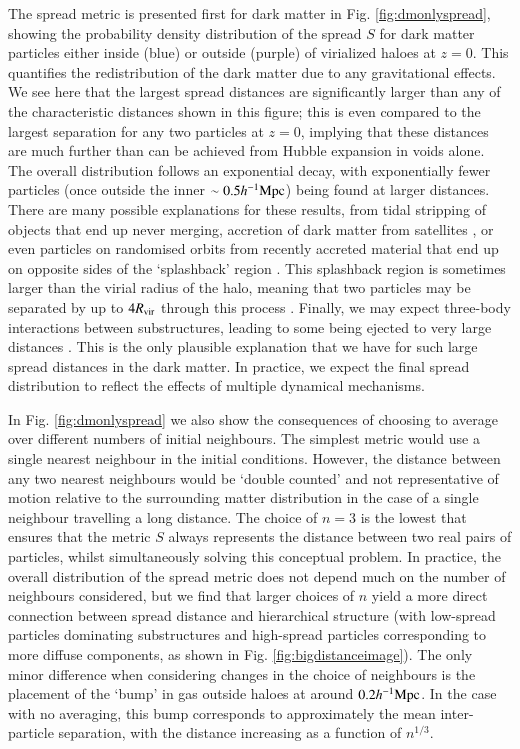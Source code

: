 The spread metric is presented first for dark matter in Fig.
\ref{fig:dmonlyspread}, showing the probability density distribution of the
spread $S$ for dark matter particles either inside (blue) or outside (purple)
of virialized haloes at $z=0$. This quantifies the redistribution of the dark
matter due to any gravitational effects. We see here that the largest spread
distances are significantly larger than any of the characteristic distances
shown in this figure; this is even compared to the largest separation for any
two particles at $z=0$, implying that these distances are much further than
can be achieved from Hubble expansion in voids alone. The overall
distribution follows an exponential decay, with exponentially fewer particles
(once outside the inner $\sim 0.5 h^{-1}{\rm Mpc}{}$) being found at larger distances.
There are many possible explanations for these results, from tidal stripping
of objects that end up never merging, accretion of dark matter from
satellites \citep[see e.g. the effects in ][]{VandenBosch2018}, or even
particles on randomised orbits from recently accreted material that end up on
opposite sides of the `splashback' region \citep{Diemer2014, Adhikari2014}.
This splashback region is sometimes larger than the virial radius of the
halo, meaning that two particles may be separated by up to $4R_{\rm vir}$
through this process \citep{Diemer2017a}. Finally, we may expect three-body
interactions between substructures, leading to some being ejected to very
large distances \citep[up to $6R_{\rm vir}$; see][]{Ludlow2009}. This is the
only plausible explanation that we have for such large spread distances in
the dark matter. In practice, we expect the final spread distribution to
reflect the effects of multiple dynamical mechanisms.

In Fig. \ref{fig:dmonlyspread} we also show the consequences of choosing to
average over different numbers of initial neighbours. The simplest metric
would use a single nearest neighbour in the initial conditions. However, the
distance between any two nearest neighbours would be ‘double counted’ and not
representative of motion relative to the surrounding matter distribution in
the case of a single neighbour travelling a long distance. The choice of
$n=3$ is the lowest that ensures that the metric $S$ always represents the
distance between two real pairs of particles, whilst simultaneously solving
this conceptual problem. In practice, the overall distribution of the spread
metric does not depend much on the number of neighbours considered, but we
find that larger choices of $n$ yield a more direct connection between spread
distance and hierarchical structure (with low-spread particles dominating
substructures and high-spread particles corresponding to more diffuse
components, as shown in Fig. \ref{fig:bigdistanceimage}). The only minor difference
when considering changes in the choice of neighbours is the placement of the
`bump' in gas outside haloes at around $0.2h^{-1}{\rm Mpc}{}$. In the case with no averaging,
this bump corresponds to approximately the mean inter-particle separation, with
the distance increasing as a function of $n^{1/3}$.


